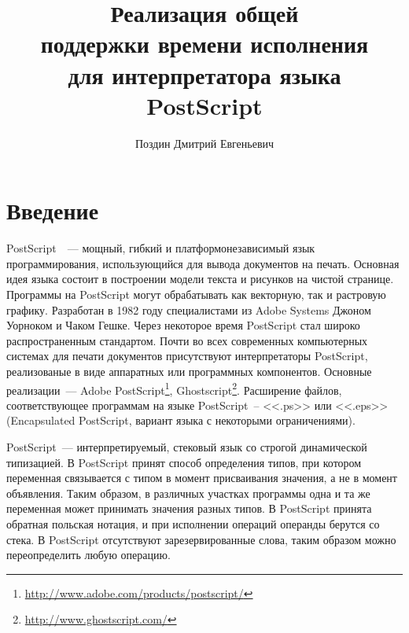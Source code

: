 \title{Реализация общей\\
поддержки времени исполнения\\
для интерпретатора языка PostScript}
%
\author{Поздин Дмитрий Евгеньевич}
%
%
%

\maketitle

\section*{Введение}

PostScript~\cite{PLRM}~--- мощный, гибкий и платформонезависимый язык программирования, использующийся для вывода документов на печать. Основная идея языка состоит в построении модели текста и рисунков на чистой странице. Программы на PostScript могут обрабатывать как векторную, так и растровую графику. Разработан в 1982 году специалистами из Adobe Systems Джоном Уорноком и Чаком Гешке. Через некоторое время PostScript стал широко распространенным стандартом. Почти во всех современных компьютерных системах для печати документов присутствуют интерпретаторы PostScript, реализованые в виде аппаратных или программных компонентов. Основные реализации~--- Adobe PostScript\footnote{\url{http://www.adobe.com/products/postscript/}}, Ghostscript\footnote{\url{http://www.ghostscript.com/}}. Расширение файлов, соответствующее программам на языке PostScript~-- <<.ps>> или <<.eps>> (Encapsulated PostScript, вариант языка с некоторыми ограничениями).

PostScript~--- интерпретируемый, стековый язык со строгой динамической типизацией. В PostScript принят способ определения типов, при котором переменная связывается с типом в момент присваивания значения, а не в момент объявления. Таким образом, в различных участках программы одна и та же переменная может принимать значения разных типов. В PostScript принята обратная польская нотация, и при исполнении операций операнды берутся со стека. В PostScript отсутствуют зарезервированные слова, таким образом можно переопределить любую операцию. 

